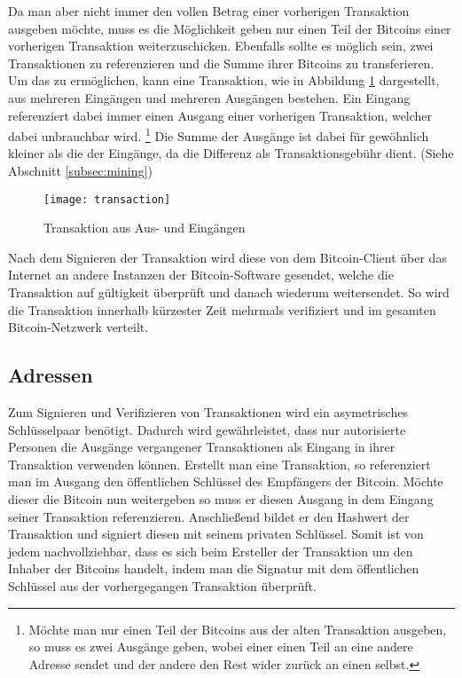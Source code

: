 Da man aber nicht immer den vollen Betrag einer vorherigen Transaktion ausgeben möchte, muss es die Möglichkeit geben nur einen Teil der Bitcoins einer vorherigen Transaktion weiterzuschicken.
Ebenfalls sollte es möglich sein, zwei Transaktionen zu referenzieren und die Summe ihrer Bitcoins zu transferieren.
Um das zu ermöglichen, kann eine Transaktion, wie in Abbildung \ref{fig:transaction} dargestellt, aus mehreren Eingängen und mehreren Ausgängen bestehen.
Ein Eingang referenziert dabei immer einen Ausgang einer vorherigen Transaktion, welcher dabei unbrauchbar wird.%
\footnote{Möchte man nur einen Teil der Bitcoins aus der alten Transaktion ausgeben, so muss es zwei Ausgänge geben, wobei einer einen Teil an eine andere Adresse sendet und der andere den Rest wider zurück an einen selbst.}
Die Summe der Ausgänge ist dabei für gewöhnlich kleiner als die der Eingänge, da die Differenz als Transaktionsgebühr dient. (Siehe Abschnitt \ref{subsec:mining})

\begin{figure}[htb]
    \begin{center}
        \texttt{[image: transaction]}
        \caption{Transaktion aus Aus- und Eingängen \parencite[5]{nakamoto}}
        \label{fig:transaction}
    \end{center}
\end{figure}

Nach dem Signieren der Transaktion wird diese von dem Bitcoin-Client über das Internet an andere Instanzen der Bitcoin-Software gesendet, welche die Transaktion auf gültigkeit überprüft und danach wiederum weitersendet.
So wird die Transaktion innerhalb kürzester Zeit mehrmals verifiziert und im gesamten Bitcoin-Netzwerk verteilt.

\subsection{Adressen}

Zum Signieren und Verifizieren von Transaktionen wird ein asymetrisches Schlüsselpaar benötigt.
Dadurch wird gewährleistet, dass nur autorisierte Personen die Ausgänge vergangener Transaktionen als Eingang in ihrer Transaktion verwenden können.
Erstellt man eine Transaktion, so referenziert man im Ausgang den öffentlichen Schlüssel des Empfängers der Bitcoin.
Möchte dieser die Bitcoin nun weitergeben so muss er diesen Ausgang in dem Eingang seiner Transaktion referenzieren.
Anschließend bildet er den Hashwert der Transaktion und signiert diesen mit seinem privaten Schlüssel.
Somit ist von jedem nachvollziehbar, dass es sich beim Ersteller der Transaktion um den Inhaber der Bitcoins handelt, indem man die Signatur mit dem öffentlichen Schlüssel aus der vorhergegangen Transaktion überprüft.

